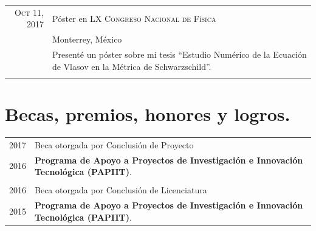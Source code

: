 \documentclass[a4paper,10pt]{article} %
\begin{document}
\begin{tabular}{r|p{11cm}}
	
	\textsc{Oct 11, 2017} & Póster en \textsc{LX Congreso Nacional de Física}\\
	 &\small Monterrey, México\\
	&\footnotesize{Presenté un póster sobre mi tesis ``Estudio Numérico de la Ecuación de Vlasov en la Métrica de Schwarzschild''.}\\
	\multicolumn{2}{c}{} \\
	
\end{tabular}




\section{Becas, premios, honores y logros.}

\begin{tabular}{r|l}
\textsc{2017} & Beca otorgada por Conclusión de Proyecto\\
\textsc{2016}&\footnotesize{\textbf{Programa de Apoyo a Proyectos de Investigación e Innovación Tecnológica (PAPIIT)}.}\\
\multicolumn{2}{c}{} \\
\textsc{2016} & Beca otorgada por Conclusión de Licenciatura\\
\textsc{2015} &\footnotesize{\textbf{Programa de Apoyo a Proyectos de Investigación e Innovación Tecnológica (PAPIIT)}.}
\end{tabular}

\end{document}
